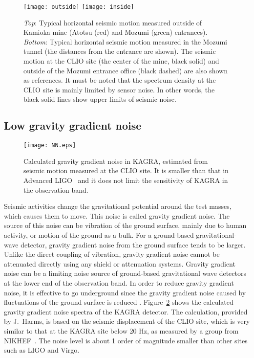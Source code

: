 \documentclass[prd ,twocolumn ,secnumarabic,dvips
,amssymb, amsmath,nobibnotes, aps, prd,superscriptaddress]{revtex4-1}
\begin{document}
{\begin{figure}
\begin{minipage}{7cm}
\texttt{[image: outside]}
\texttt{[image: inside]}
\end{minipage} 
\caption{\label{insideoutside}{\it Top}: Typical horizontal seismic motion measured outside of Kamioka mine (Atotsu (red) and Mozumi (green) entrances). {\it Bottom}: Typical horizontal seismic motion measured in the Mozumi tunnel (the distances from the entrance are shown). The seismic motion at the CLIO site (the center of the mine, black solid) and outside of the Mozumi entrance office (black dashed) are also shown as references. It must be noted that the spectrum density at the CLIO site is mainly limited by sensor noise. In other words, the black solid lines show upper limits of seismic noise.}
\end{figure}

\subsection{Low gravity gradient noise}
%
\begin{figure}[htbp]
	\begin{center}
		\texttt{[image: NN.eps]}
		\caption{\label{fig:NN}Calculated gravity gradient noise in KAGRA, estimated from seismic motion measured at the CLIO site. It is smaller than that in Advanced LIGO~\cite{JanLIGO} and it does not limit the sensitivity of KAGRA in the observation band.}
	\end{center}
\end{figure}

Seismic activities change the gravitational potential around the test masses, which causes them to move. This noise is called gravity gradient noise. The source of this noise can be vibration of the ground surface, mainly due to human activity, or motion of the ground as a bulk. For a ground-based gravitational-wave detector, gravity gradient noise from the ground surface tends to be larger. Unlike the direct coupling of vibration, gravity gradient noise cannot be attenuated directly using any shield or attenuation systems. Gravity gradient noise can be a limiting noise source of ground-based gravitational wave detectors at the lower end of the observation band.
In order to reduce gravity gradient noise, it is effective to go underground since the gravity gradient noise caused by fluctuations of the ground surface is reduced \cite{Beker2011}.
Figure~\ref{fig:NN} shows the calculated gravity gradient noise spectra of the KAGRA detector. The calculation, provided by J.~Harms, is based on the seismic displacement of the CLIO site, which is very similar to that at the KAGRA site below 20 Hz, as measured by a group from NIKHEF~\cite{NIKHEFmeasurement}. The noise level is about 1 order of magnitude smaller than other sites such as LIGO and Virgo. 

}
\end{document}
